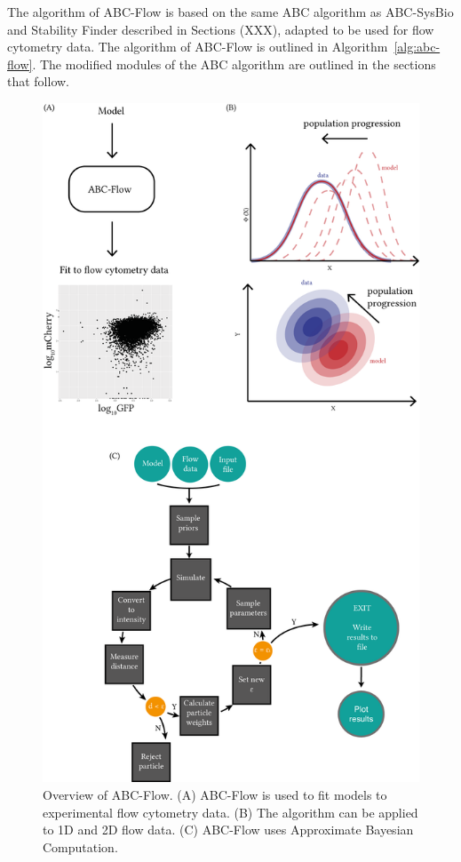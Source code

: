The algorithm of ABC-Flow is based on the same ABC algorithm as ABC-SysBio and Stability Finder described in Sections (XXX), adapted to be used for flow cytometry data. The algorithm of ABC-Flow is outlined in Algorithm~\ref{alg:abc-flow}. The modified modules of the ABC algorithm are outlined in the sections that follow.

\begin{figure}[htbp]
	\begin{center}
		\includegraphics[scale=1.1]{../../chapters/chapterABCFlow/images/abc-flow-overv.png}
		\caption[LoF caption]{\label{fig:abcflow-overv}Overview of ABC-Flow. (A) ABC-Flow is used to fit models to experimental flow cytometry data. (B) The algorithm can be applied to 1D and 2D flow data. (C) ABC-Flow uses Approximate Bayesian Computation.}
	\end{center}
\end{figure}


